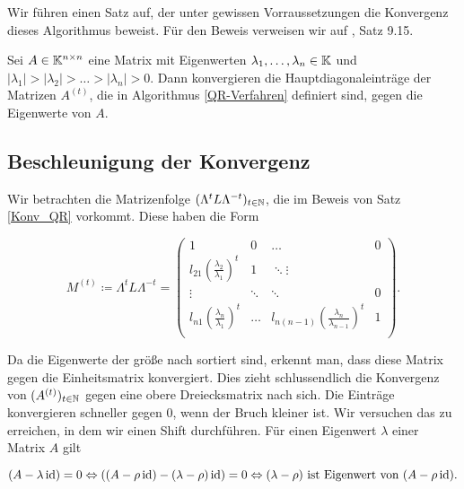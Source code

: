 \documentclass{article}
\begin{document}
Wir führen einen Satz auf, der unter gewissen Vorraussetzungen die Konvergenz dieses Algorithmus beweist. Für den Beweis verweisen wir auf \cite{Nannen-Skript}, Satz 9.15.

\begin{theorem}
	\label{Konv_QR}
	Sei $A \in \mathbb{K}^{n\times n}$ eine Matrix mit Eigenwerten $\lambda_1,\dots,\lambda_n \in \mathbb{K}$ und $|\lambda_1| > |\lambda_2| > \dots > |\lambda_n| > 0$. Dann konvergieren die Hauptdiagonaleinträge der Matrizen $A^{(t)}$, die in Algorithmus \ref{QR-Verfahren} definiert sind, gegen die Eigenwerte von $A$.
\end{theorem}


\subsection{Beschleunigung der Konvergenz}

Wir betrachten die Matrizenfolge $(\Lambda^t L \Lambda^{-t})_{t \in \mathbb{N}}$, die im Beweis von Satz \ref{Konv_QR} vorkommt. Diese haben die Form

\begin{equation*}
	M^{(t)} \coloneqq \Lambda^t L \Lambda^{-t} =
	\left( \begin{array}{rrrr}
		1 & 0 & \dots & 0 \\
		l_{21} \left(\frac{\lambda_2}{\lambda_1}\right)^t & 1 & \ddots \vdots \\
		\vdots & \ddots & \ddots & 0 \\
		l_{n1} \left(\frac{\lambda_n}{\lambda_1}\right)^t & \dots & l_{n(n-1)} \left(\frac{\lambda_n}{\lambda_{n-1}}\right)^t & 1 \\
	\end{array}\right).
\end{equation*}

Da die Eigenwerte der größe nach sortiert sind, erkennt man, dass diese Matrix gegen die Einheitsmatrix konvergiert. Dies zieht schlussendlich die Konvergenz von $(A^{(t)})_{t\in \mathbb{N}}$ gegen eine obere Dreiecksmatrix nach sich.
Die Einträge konvergieren schneller gegen $0$, wenn der Bruch kleiner ist. Wir versuchen das zu erreichen, in dem wir einen Shift durchführen. Für einen Eigenwert $\lambda$ einer Matrix $A$ gilt

\begin{equation*}
	(A - \lambda \operatorname{id}) = 0 \Leftrightarrow ((A - \rho \operatorname{id}) - (\lambda -\rho) \operatorname{id}) = 0 \Leftrightarrow (\lambda-\rho) \text{ ist Eigenwert von }  (A - \rho \operatorname{id}).
\end{equation*}
\end{document}
